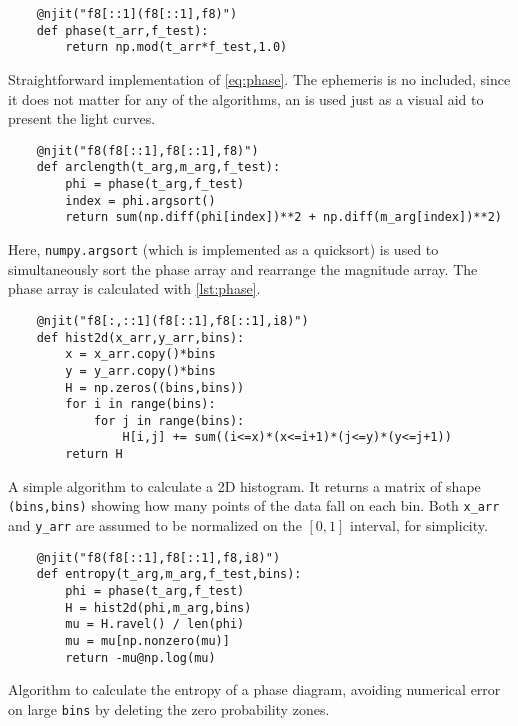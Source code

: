 \begin{listing}
	\begin{verbatim}
	@njit("f8[::1](f8[::1],f8)")
	def phase(t_arr,f_test):
	    return np.mod(t_arr*f_test,1.0)
	\end{verbatim}
	\caption[\texttt{phase} function]{
		Straightforward implementation of \ref{eq:phase}. 
		The ephemeris is no included, since it does not matter for any of the algorithms,
		an is used just as a visual aid to present the light curves.
	}
	\label{lst:phase}
\end{listing}

\begin{listing}
	\begin{verbatim}
	@njit("f8(f8[::1],f8[::1],f8)")
	def arclength(t_arg,m_arg,f_test):
	    phi = phase(t_arg,f_test)
	    index = phi.argsort()
	    return sum(np.diff(phi[index])**2 + np.diff(m_arg[index])**2)
	\end{verbatim}
	\caption[Arclength method implementation]{
		Here, \texttt{numpy.argsort} (which is implemented as a quicksort) is used to simultaneously 
		sort the phase array and rearrange the magnitude array.
		The phase array is calculated with \autoref{lst:phase}.
	}
	\label{lst:arclength}
\end{listing}

\begin{listing}
	\begin{verbatim}
	@njit("f8[:,::1](f8[::1],f8[::1],i8)")
	def hist2d(x_arr,y_arr,bins):
	    x = x_arr.copy()*bins
	    y = y_arr.copy()*bins
	    H = np.zeros((bins,bins))
	    for i in range(bins):
	        for j in range(bins):
	            H[i,j] += sum((i<=x)*(x<=i+1)*(j<=y)*(y<=j+1))
	    return H
	\end{verbatim}
	\caption[2D histogram simple algorithm]{
		A simple algorithm to calculate a 2D histogram. 
		It returns a matrix of shape \texttt{(bins,bins)} showing how many points of the data fall on each bin.
		Both \texttt{x\_arr} and \texttt{y\_arr} are assumed to be normalized on the $[0,1]$ interval, for simplicity.
	}
	\label{lst:hist2d}
\end{listing}

\begin{listing}
	\begin{verbatim}
	@njit("f8(f8[::1],f8[::1],f8,i8)")
	def entropy(t_arg,m_arg,f_test,bins):
	    phi = phase(t_arg,f_test)
	    H = hist2d(phi,m_arg,bins)
	    mu = H.ravel() / len(phi)
	    mu = mu[np.nonzero(mu)]
	    return -mu@np.log(mu)
	\end{verbatim}
	\caption[Naive entropy method implementation]{
		Algorithm to calculate the entropy of a phase diagram, 
		avoiding numerical error on large \texttt{bins} by deleting the zero probability zones.
	}
	\label{lst:entropy}
\end{listing}

